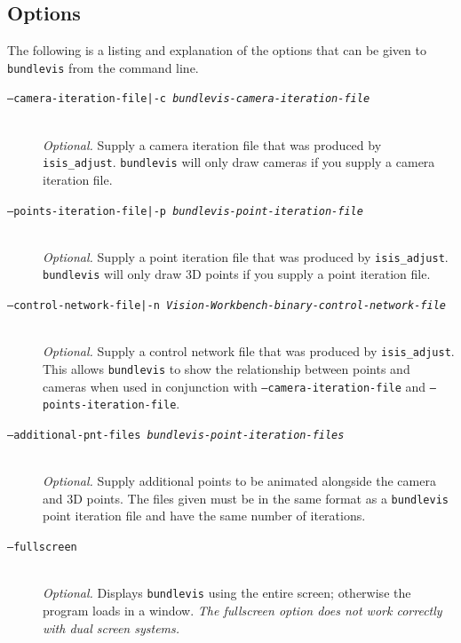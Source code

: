 \subsection{Options}

The following is a listing and explanation of the options
that can be given to \texttt{bundlevis} from the command line.

\begin{description}

\item[\texttt{--camera-iteration-file|-c \textit{bundlevis-camera-iteration-file}}] \hfill \\
  \emph{Optional.} Supply a camera iteration file that was produced by
       \texttt{isis\_adjust}.  \texttt{bundlevis} will only draw cameras
       if you supply a camera iteration file.

\item[\texttt{--points-iteration-file|-p \textit{bundlevis-point-iteration-file}}] \hfill \\
  \emph{Optional.} Supply a point iteration file that was produced by
       \texttt{isis\_adjust}.  \texttt{bundlevis} will only draw 3D points
       if you supply a point iteration file.

\item[\texttt{--control-network-file|-n \textit{Vision-Workbench-binary-control-network-file}}] \hfill \\
  \emph{Optional.} Supply a control network file that was produced by
       {\tt isis\_adjust}.  This allows {\tt bundlevis} to show the
       relationship between points and cameras when used in
       conjunction with \texttt{--camera-iteration-file} and
       \texttt{--points-iteration-file}.

\item[\texttt{--additional-pnt-files \textit{bundlevis-point-iteration-files}}] \hfill \\
  \emph{Optional.} Supply additional points to be animated alongside
  the camera and 3D points.  The files given must be in the same
  format as a \texttt{bundlevis} point iteration file and have the same number
  of iterations.

\item[\texttt{--fullscreen}] \hfill \\
  \emph{Optional.} Displays \texttt{bundlevis} using the entire screen;
  otherwise the program loads in a window. \emph{The fullscreen option
    does not work correctly with dual screen systems.}


\end{description}
